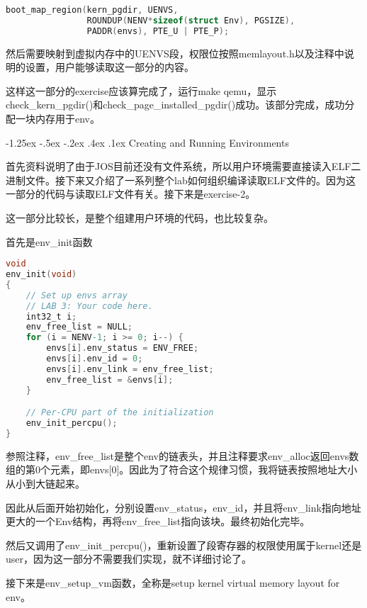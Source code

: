 \documentclass[11pt,a4paper]{article}
\makeatletter
\newcommand{\sihao}{\fontsize{14pt}{\baselineskip}\selectfont}
\renewcommand\subsection{\@startsection{subsection}{1}{\z@}%
{-1.25ex \@plus -.5ex \@minus -.2ex}%
{.4ex \@plus .1ex}%
{\normalfont\sihao\fontspec{黑体}}}
\makeatother
\begin{document}
\setmainfont{Consolas}
\begin{lstlisting}[language={C},firstnumber=1,title=kern/pmap.c] 
boot_map_region(kern_pgdir, UENVS,
                ROUNDUP(NENV*sizeof(struct Env), PGSIZE), 
                PADDR(envs), PTE_U | PTE_P);
\end{lstlisting}
\setmainfont[BoldFont=黑体]{宋体}

然后需要映射到虚拟内存中的UENVS段，权限位按照memlayout.h以及注释中说明的设置，用户能够读取这一部分的内容。

这样这一部分的exercise应该算完成了，运行make qemu，显示check\_kern\_pgdir()和check\_page\_installed\_pgdir()成功。该部分完成，成功分配一块内存用于env。

\subsection{Creating and Running Environments}

首先资料说明了由于JOS目前还没有文件系统，所以用户环境需要直接读入ELF二进制文件。接下来又介绍了一系列整个lab如何组织编译读取ELF文件的。因为这一部分的代码与读取ELF文件有关。接下来是exercise-2。

这一部分比较长，是整个组建用户环境的代码，也比较复杂。

首先是env\_init函数

\setmainfont{Consolas}
\begin{lstlisting}[language={C},firstnumber=1,title=kern/env.c] 
void
env_init(void)
{
	// Set up envs array
	// LAB 3: Your code here.
	int32_t i;
	env_free_list = NULL;
	for (i = NENV-1; i >= 0; i--) {
		envs[i].env_status = ENV_FREE;
		envs[i].env_id = 0;
		envs[i].env_link = env_free_list;
		env_free_list = &envs[i];
	}

	// Per-CPU part of the initialization
	env_init_percpu();
}
\end{lstlisting}
\setmainfont[BoldFont=黑体]{宋体}

参照注释，env\_free\_list是整个env的链表头，并且注释要求env\_alloc返回envs数组的第0个元素，即envs[0]。因此为了符合这个规律习惯，我将链表按照地址大小从小到大链起来。

因此从后面开始初始化，分别设置env\_status，env\_id，并且将env\_link指向地址更大的一个Env结构，再将env\_free\_list指向该块。最终初始化完毕。

然后又调用了env\_init\_percpu()，重新设置了段寄存器的权限使用属于kernel还是user，因为这一部分不需要我们实现，就不详细讨论了。

接下来是env\_setup\_vm函数，全称是setup kernel virtual memory layout for env。
\end{document}
